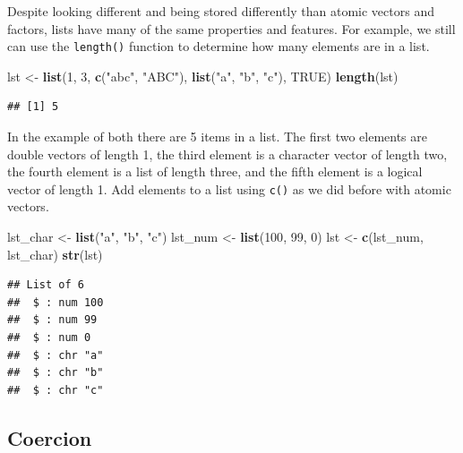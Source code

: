 \documentclass[
]{book}
\newenvironment{Shaded}{\begin{snugshade}}{\end{snugshade}}
\newcommand{\DecValTok}[1]{\textcolor[rgb]{0.00,0.00,0.81}{#1}}
\newcommand{\KeywordTok}[1]{\textcolor[rgb]{0.13,0.29,0.53}{\textbf{#1}}}
\newcommand{\NormalTok}[1]{#1}
\newcommand{\OtherTok}[1]{\textcolor[rgb]{0.56,0.35,0.01}{#1}}
\newcommand{\StringTok}[1]{\textcolor[rgb]{0.31,0.60,0.02}{#1}}
\begin{document}
Despite looking different and being stored differently than atomic vectors and factors, lists have many of the same properties and features. For example, we still can use the \texttt{length()} function to determine how many elements are in a list.

\begin{Shaded}
\begin{Highlighting}[]
\NormalTok{lst <-}\StringTok{ }\KeywordTok{list}\NormalTok{(}\DecValTok{1}\NormalTok{, }\DecValTok{3}\NormalTok{, }\KeywordTok{c}\NormalTok{(}\StringTok{"abc"}\NormalTok{, }\StringTok{"ABC"}\NormalTok{), }\KeywordTok{list}\NormalTok{(}\StringTok{"a"}\NormalTok{, }\StringTok{"b"}\NormalTok{, }\StringTok{"c"}\NormalTok{), }\OtherTok{TRUE}\NormalTok{)}
\KeywordTok{length}\NormalTok{(lst)}
\end{Highlighting}
\end{Shaded}

\begin{verbatim}
## [1] 5
\end{verbatim}

In the example of both there are 5 items in a list. The first two elements are double vectors of length 1, the third element is a character vector of length two, the fourth element is a list of length three, and the fifth element is a logical vector of length 1.
Add elements to a list using \texttt{c()} as we did before with atomic vectors.

\begin{Shaded}
\begin{Highlighting}[]
\NormalTok{lst_char <-}\StringTok{ }\KeywordTok{list}\NormalTok{(}\StringTok{"a"}\NormalTok{, }\StringTok{"b"}\NormalTok{, }\StringTok{"c"}\NormalTok{)}
\NormalTok{lst_num <-}\StringTok{ }\KeywordTok{list}\NormalTok{(}\DecValTok{100}\NormalTok{, }\DecValTok{99}\NormalTok{, }\DecValTok{0}\NormalTok{)}
\NormalTok{lst <-}\StringTok{ }\KeywordTok{c}\NormalTok{(lst_num, lst_char)}
\KeywordTok{str}\NormalTok{(lst)}
\end{Highlighting}
\end{Shaded}

\begin{verbatim}
## List of 6
##  $ : num 100
##  $ : num 99
##  $ : num 0
##  $ : chr "a"
##  $ : chr "b"
##  $ : chr "c"
\end{verbatim}

\hypertarget{coercion-2}{%
\subsection{Coercion}\label{coercion-2}}
\end{document}
